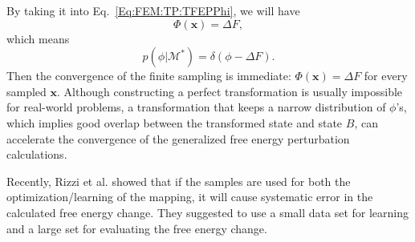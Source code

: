 By taking it into Eq.~\ref{Eq:FEM:TP:TFEPPhi}, we will have
\begin{equation}
	\Phi(\mathbf{x})=\Delta F,
\end{equation}
which means
\begin{equation}
	p(\phi|\mathcal{M}^\ast)=\delta (\phi-\Delta F).
\end{equation}
Then the convergence of the finite sampling is immediate: $\Phi(\mathbf{x})=\Delta F$ for every sampled $\mathbf{x}$. Although constructing a perfect transformation is usually impossible for real-world problems, a transformation that keeps a narrow distribution of $\phi$'s, which implies good overlap between the transformed state and state $B$, can accelerate the convergence of the generalized free energy perturbation calculations.

Recently, Rizzi et al. showed that if the samples are used for both the optimization/learning of the mapping, it will cause systematic error in the calculated free energy change.\cite{RizziJPCL2021} They suggested to use a small data set for learning and a large set for evaluating the free energy change.

